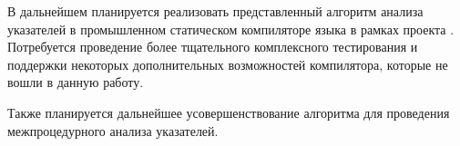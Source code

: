 \documentclass[14pt,titlepage,draft]{extarticle}
\newcommand{\java}{\eng{Java}\xspace}
\begin{document}

    В дальнейшем планируется реализовать представленный алгоритм анализа
    указателей в промышленном статическом компиляторе языка \java в
    рамках проекта . Потребуется проведение более
    тщательного комплексного тестирования и поддержки некоторых дополнительных
    возможностей компилятора, которые не вошли в данную работу.

    Также планируется дальнейшее усовершенствование алгоритма для
    проведения межпроцедурного анализа указателей.


  \newpage
  
  
\end{document}
